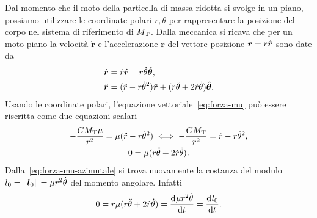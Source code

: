 Dal momento che il moto della particella di massa ridotta si svolge in un piano,
possiamo utilizzare le coordinate polari $r,\theta$ per rappresentare la
posizione del corpo nel sistema di riferimento di $M_\textup{T}$. Dalla
meccanica si ricava che per un moto piano la velocità $\dot{\bm{r}}$ e
l'accelerazione $\ddot{\bm{r}}$ del vettore posizione $\bm{r}=r\hat{\bm{r}}$ sono
date da
\begin{subequations}
  \begin{align}
    \dot{\bm{r}}  &= \dot{r}\hat{\bm{r}} +
    r\dot{\theta}\hat{\bm{\theta}}, \label{eq:velocita-polare}\\
    \ddot{\bm{r}} &= (\ddot{r}-r\dot{\theta}^2)\hat{\bm{r}} + (r\ddot{\theta} +
    2\dot{r}\dot{\theta}) \hat{\bm{\theta}}.
  \end{align}
\end{subequations}
Usando le coordinate polari, l'equazione vettoriale~\eqref{eq:forza-mu} può
essere riscritta come due equazioni scalari
\begin{subequations}
  \begin{gather}
    -\frac{GM_\textup{T}\mu}{r^2} = \mu(\ddot{r} - r\dot{\theta}^2) \iff
    -\frac{GM_\textup{T}}{r^2}=\ddot{r}-r\dot{\theta}^2,
    \label{eq:forza-mu-radiale}\\
    0 = \mu(r\ddot{\theta} +
    2\dot{r}\dot{\theta}). \label{eq:forza-mu-azimutale}
  \end{gather}
\end{subequations}
Dalla~\eqref{eq:forza-mu-azimutale} si trova nuovamente la costanza del modulo
$l_0 = \lVert\bm{l}_0\rVert = \mu r^2\dot{\theta}$ del momento angolare. Infatti
\begin{equation}
  0 = r\mu(r\ddot{\theta} + 2\dot{r}\dot{\theta}) = \frac{{\mathop{}\!\mathrm{d}^{}}\mu
    r^2\dot{\theta}}{\mathop{}\!\mathrm{d} {t}^{}} = \frac{{\mathop{}\!\mathrm{d}^{}}l_0}{\mathop{}\!\mathrm{d} {t}^{}}.
\end{equation}

